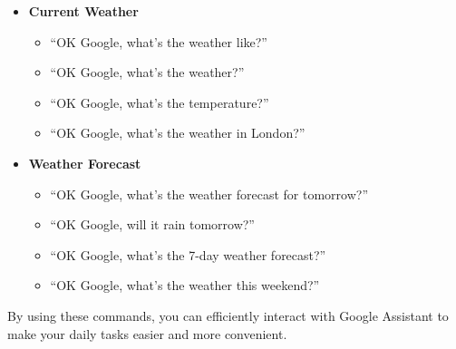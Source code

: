 \documentclass[
  a4paper,
]{article}
\providecommand{\tightlist}{%
  \setlength{\itemsep}{0pt}\setlength{\parskip}{0pt}}\usepackage{longtable,booktabs,array}
\begin{document}
\begin{itemize}
\tightlist
\item
  \textbf{Current Weather}

  \begin{itemize}
  \tightlist
  \item
    ``OK Google, what's the weather like?''
  \item
    ``OK Google, what's the weather?''
  \item
    ``OK Google, what's the temperature?''
  \item
    ``OK Google, what's the weather in London?''
  \end{itemize}
\item
  \textbf{Weather Forecast}

  \begin{itemize}
  \tightlist
  \item
    ``OK Google, what's the weather forecast for tomorrow?''
  \item
    ``OK Google, will it rain tomorrow?''
  \item
    ``OK Google, what's the 7-day weather forecast?''
  \item
    ``OK Google, what's the weather this weekend?''
  \end{itemize}
\end{itemize}

By using these commands, you can efficiently interact with Google
Assistant to make your daily tasks easier and more convenient.


\printbibliography
\end{document}
